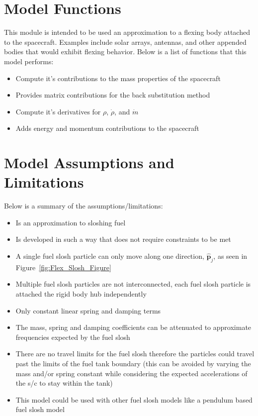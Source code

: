 \section{Model Functions}

This module is intended to be used an approximation to a flexing body attached to the spacecraft. Examples include solar arrays, antennas, and other appended bodies that would exhibit flexing behavior. Below is a list of functions that this model performs:

\begin{itemize}
	\item Compute it's contributions to the mass properties of the spacecraft
	\item Provides matrix contributions for the back substitution method
	\item Compute it's derivatives for $\rho$, $\dot{\rho}$, and $\dot{m}$
	\item Adds energy and momentum contributions to the spacecraft
\end{itemize}

\section{Model Assumptions and Limitations}
Below is a summary of the assumptions/limitations:

\begin{itemize}
	\item Is an approximation to sloshing fuel
	\item Is developed in such a way that does not require constraints to be met
	\item A single fuel slosh particle can only move along one direction, $\hat{\bm p}_j$, as seen in Figure~\ref{fig:Flex_Slosh_Figure}
	\item Multiple fuel slosh particles are not interconnected, each fuel slosh particle is attached the rigid body hub independently
	\item Only constant linear spring and damping terms
	\item The mass, spring and damping coefficients can be attenuated to approximate frequencies expected by the fuel slosh
	\item There are no travel limits for the fuel slosh therefore the particles could travel past the limits of the fuel tank boundary (this can be avoided by varying the mass and/or spring constant while considering the expected accelerations of the s/c to stay within the tank)
	\item This model could be used with other fuel slosh models like a pendulum based fuel slosh model
\end{itemize}